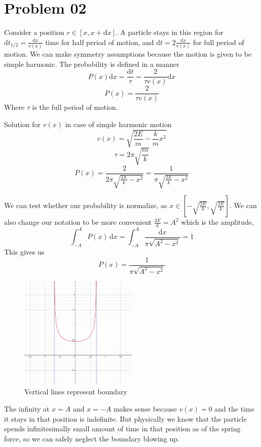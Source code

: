 \documentclass[letter]{article}
\begin{document}
	\section{Problem 02} 

	Consider a position $r \in  [x,  x + \mathrm{d} x]$. A particle stays in this region for $\mathrm{d} t_{1 / 2 } = \frac{\mathrm{d} x}{v(x)}$ time for half period of motion, and $ \mathrm{d} t = 2 \frac{\mathrm{d} x}{v(x)}$ for full period of motion. We can make symmetry assumptions because the motion is given to be simple harmonic. 
	The probability is defined in a manner
	\[
	P(x) \mathrm{d} x = \frac{\mathrm{d} t}{\tau} = \frac{2}{\tau v(x)} \mathrm{d} x 
	\]
	\[
	\boxed{
	P(x) = \frac{2}{\tau v(x)}
	}
	\] Where $\tau$ is the full period of motion.

	Solution for $v(x)$ in case of simple harmonic motion 
	\[
		v(x) = \sqrt{\frac{2E}{m} - \frac{k}{m} x^2}  \]
	\[
	\tau = 2 \pi \sqrt{\frac{m}{k}} 
	\]
	\[
	P(x) = \frac{2}{2 \pi \sqrt{\frac{2E}{k} - x^2} } = \frac{1}{ \pi \sqrt{\frac{2E}{k} - x^2} }
	\]

	We can test whether our probability is normalize, as $x \in \left[-\sqrt{  \frac{2E}{k}}, \sqrt{ \frac{2E}{k} } \right]$. We can also change our notation to be more convenient $\frac{2E}{k} = A^2$ which is the amplitude, 
	\[
	\int_{-A}^{A} P(x) \, \mathrm{d} x =  \int_{-A}^{A} \frac{\mathrm{d}  x}{\pi \sqrt{A^2 - x^2} } = 1 
	\] 
	This gives us 
	\[
	\boxed{
	P(x) = \frac{1}{\pi \sqrt{A^2 - x^2} }
	}
	\] 

	\begin{figure}[H]
		\centering
		\includegraphics[width=0.5\textwidth]{ss/ncl01.png}
		\caption{Vertical lines represent boundary}
		\label{fig:ss-ncl01-png}
	\end{figure}
	The infinity at $x = A$ and $x = -A$ makes sense because $v(x) = 0$ and the time it stays in that position is indefinite. But physically we know that the particle spends infinitesimally small amount of time in that position as  of the spring force, so we can safely neglect the boundary blowing up. 
\end{document}
